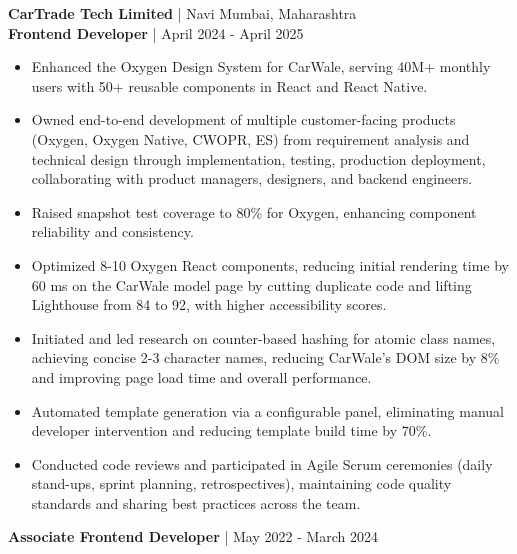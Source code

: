 \documentclass[letterpaper,10.5pt]{article}
\begin{document}
\vspace{2pt}

\textbf{CarTrade Tech Limited} | Navi Mumbai, Maharashtra\\
\textbf{Frontend Developer} | April 2024 - April 2025

\begin{itemize}[leftmargin=0.15in, itemsep=-1pt]
    \item Enhanced the Oxygen Design System for CarWale, serving 40M+ monthly users with 50+ reusable components in React and React Native.
    \item Owned end-to-end development of multiple customer-facing products (Oxygen, Oxygen Native, CWOPR, ES) from requirement analysis and technical design through implementation, testing, production deployment, collaborating with product managers, designers, and backend engineers.
    \item Raised snapshot test coverage to 80\% for Oxygen, enhancing component reliability and consistency.
    \item Optimized 8-10 Oxygen React components, reducing initial rendering time by 60 ms on the CarWale model page by cutting duplicate code and lifting Lighthouse from 84 to 92, with higher accessibility scores.
    \item Initiated and led research on counter-based hashing for atomic class names, achieving concise 2-3 character names, reducing CarWale's DOM size by 8\% and improving page load time and overall performance.
    \item Automated template generation via a configurable panel, eliminating manual developer intervention and reducing template build time by 70\%.
    \item Conducted code reviews and participated in Agile Scrum ceremonies (daily stand-ups, sprint planning, retrospectives), maintaining code quality standards and sharing best practices across the team.
\end{itemize}

\vspace{2pt}

\textbf{Associate Frontend Developer} | May 2022 - March 2024
\end{document}
